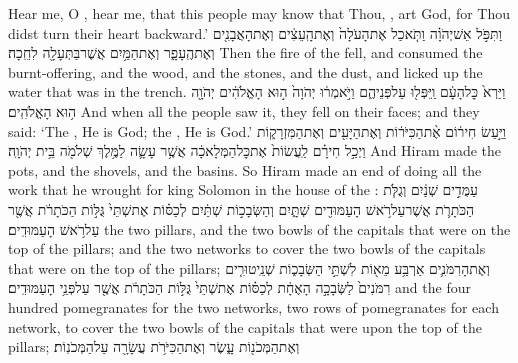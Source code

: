 {Hear me, O \lord, hear me, that this people may know that Thou, \lord, art God, for Thou didst turn their heart backward.’}
{וַתִּפֹּ֣ל אֵשׁ\maqqaf יְהֹוָ֗ה וַתֹּ֤אכַל אֶת\maqqaf הָעֹלָה֙ וְאֶת\maqqaf הָֽעֵצִ֔ים וְאֶת\maqqaf הָאֲבָנִ֖ים וְאֶת\maqqaf הֶֽעָפָ֑ר וְאֶת\maqqaf הַמַּ֥יִם אֲשֶׁר\maqqaf בַּתְּעָלָ֖ה לִחֵֽכָה׃}
{Then the fire of the \lord\space fell, and consumed the burnt-offering, and the wood, and the stones, and the dust, and licked up the water that was in the trench.}
{וַיַּרְא֙ כׇּל\maqqaf הָעָ֔ם וַֽיִּפְּל֖וּ עַל\maqqaf פְּנֵיהֶ֑ם וַיֹּ֣אמְר֔וּ יְהֹוָה֙ ה֣וּא הָאֱלֹהִ֔ים יְהֹוָ֖ה ה֥וּא הָאֱלֹהִֽים׃}
{And when all the people saw it, they fell on their faces; and they said: ‘The \lord, He is God; the \lord, He is God.’}
\label{haft_22}
\setcounter{chap}{7}
\setcounter{verse}{40}
{וַיַּ֣עַשׂ חִיר֔וֹם אֶ֨ת\maqqaf הַכִּיֹּר֔וֹת וְאֶת\maqqaf הַיָּעִ֖ים וְאֶת\maqqaf הַמִּזְרָק֑וֹת וַיְכַ֣ל חִירָ֗ם לַֽעֲשׂוֹת֙ אֶת\maqqaf כׇּל\maqqaf הַמְּלָאכָ֔ה אֲשֶׁ֥ר עָשָׂ֛ה לַמֶּ֥לֶךְ שְׁלֹמֹ֖ה בֵּ֥ית יְהֹוָֽה׃}
{And Hiram made the pots, and the shovels, and the basins. So Hiram made an end of doing all the work that he wrought for king Solomon in the house of the \lord:}
{עַמֻּדִ֣ים שְׁנַ֔יִם וְגֻלֹּ֧ת הַכֹּתָרֹ֛ת אֲשֶׁר\maqqaf עַל\maqqaf רֹ֥אשׁ הָעַמּוּדִ֖ים שְׁתָּ֑יִם וְהַשְּׂבָכ֣וֹת שְׁתַּ֔יִם לְכַסּ֗וֹת אֶת\maqqaf שְׁתֵּי֙ גֻּלּ֣וֹת הַכֹּתָרֹ֔ת אֲשֶׁ֖ר עַל\maqqaf רֹ֥אשׁ הָעַמּוּדִֽים׃}
{the two pillars, and the two bowls of the capitals that were on the top of the pillars; and the two networks to cover the two bowls of the capitals that were on the top of the pillars;}
{וְאֶת\maqqaf הָרִמֹּנִ֛ים אַרְבַּ֥ע מֵא֖וֹת לִשְׁתֵּ֣י הַשְּׂבָכ֑וֹת שְׁנֵֽי\maqqaf טוּרִ֤ים רִמֹּנִים֙ לַשְּׂבָכָ֣ה הָאֶחָ֔ת לְכַסּ֗וֹת אֶת\maqqaf שְׁתֵּי֙ גֻּלּ֣וֹת הַכֹּתָרֹ֔ת אֲשֶׁ֖ר עַל\maqqaf פְּנֵ֥י הָעַמּוּדִֽים׃}
{and the four hundred pomegranates for the two networks, two rows of pomegranates for each network, to cover the two bowls of the capitals that were upon the top of the pillars;}
{וְאֶת\maqqaf הַמְּכֹנ֖וֹת עָ֑שֶׂר וְאֶת\maqqaf הַכִּיֹּרֹ֥ת עֲשָׂרָ֖ה עַל\maqqaf הַמְּכֹנֽוֹת׃}
